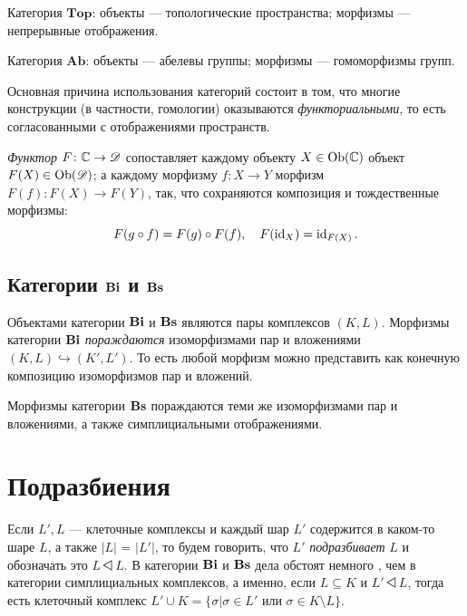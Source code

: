 \documentclass[10pt, twoside]{article}
\begin{document}
\begin{example}
Категория $\mathbf{Top}$: объекты --- топологические пространства; морфизмы --- непрерывные отображения.
\end{example}

\begin{example}
Категория $\mathbf{Ab}$: объекты --- абелевы группы; морфизмы --- гомоморфизмы групп.
\end{example}

Основная причина использования категорий состоит в том, что многие конструкции (в частности, гомологии) оказываются \emph{функториальными}, то есть согласованными с отображениями пространств.

\begin{definition}
\emph{Функтор} $F \colon \mathbb C \to \mathscr D$ сопоставляет каждому объекту $X \in \operatorname{Ob}(\mathbb C)$ объект $F(X) \in \operatorname{Ob}(\mathscr D)$; а каждому морфизму $f : X \to Y$ морфизм $F(f) : F(X) \to F(Y)$, так, что сохраняются композиция и тождественные морфизмы:
\[
F(g \circ f) = F(g)\circ F(f), \quad F(\operatorname{id}_X) = \operatorname{id}_{F(X)}.
\]
\end{definition}

\subsection[Категории Bi и Bs]{Категории $\mathbf{Bi}$ и $\mathbf{Bs}$}
Объектами категории $\mathbf{Bi}$ и $\mathbf{Bs}$ являются пары комплексов $(K, L)$. Морфизмы категории $\mathbf{Bi}$ \emph{пораждаются} изоморфизмами пар и вложениями $(K, L) \hookrightarrow (K', L')$. То есть любой морфизм можно представить как конечную композицию изоморфизмов пар и вложений.

Морфизмы категории $\mathbf{Bs}$ пораждаются теми же изоморфизмами пар и вложениями, а также симплициальными отображениями. 

\section{Подразбиения}
Если $L', L$ --- клеточные комплексы и каждый шар $L'$ содержится в каком-то шаре $L$, а также $|L|$ = $|L'|$, то будем говорить, что $L'$ \emph{подразбивает} $L$ и обозначать это $L \bigtriangleleft L$. В категории $\mathbf{Bi}$ и $\mathbf{Bs}$ дела обстоят немного , чем в категории симплициальных комплексов, а именно, если $L \subseteq K$ и $L' \bigtriangleleft L$, тогда есть клеточный комплекс $L' \cup K = \{\sigma| \sigma \in L' \text{ или } \sigma \in K\setminus L\}$.
\end{document}

